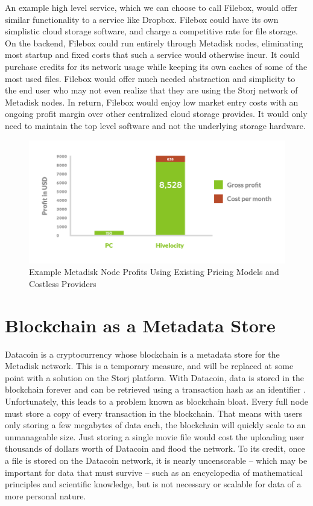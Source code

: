 \documentclass[a4paper,10pt]{article}
\begin{document}
An example high level service, which we can choose to call Filebox, would offer similar functionality to a service like Dropbox. Filebox could have its own simplistic cloud storage software, and charge a competitive rate for file storage. On the backend, Filebox could run entirely through Metadisk nodes, eliminating most startup and fixed costs that such a service would otherwise incur. It could purchase credits for its network usage while keeping its own caches of some of the most used files. Filebox would offer much needed abstraction and simplicity to the end user who may not even realize that they are using the Storj network of Metadisk nodes. In return, Filebox would enjoy low market entry costs with an ongoing profit margin over other centralized cloud storage provides. It would only need to maintain the top level software and not the underlying storage hardware.

\begin{figure}[h!]
  \centering
      \includegraphics[width=\linewidth]{05}
  \caption{Example Metadisk Node Profits Using Existing Pricing Models and Costless Providers}
\end{figure}


\section{Blockchain as a Metadata Store}

Datacoin \cite{12} is a cryptocurrency whose blockchain is a metadata store for the Metadisk network. This is a temporary measure, and will be replaced at some point with a solution on the Storj platform.  With Datacoin, data is stored in the blockchain forever and can be retrieved using a transaction hash as an identifier \cite{12}. Unfortunately, this leads to a problem known as blockchain bloat. Every full node must store a copy of every transaction in the blockchain. That means with users only storing a few megabytes of data each, the blockchain will quickly scale to an unmanageable size. Just storing a single movie file would cost the uploading user thousands of dollars worth of Datacoin and flood the network. To its credit, once a file is stored on the Datacoin network, it is nearly uncensorable -- which may be important for data that must survive -- such as an encyclopedia of mathematical principles and scientific knowledge, but is not necessary or scalable for data of a more personal nature.
\end{document}
